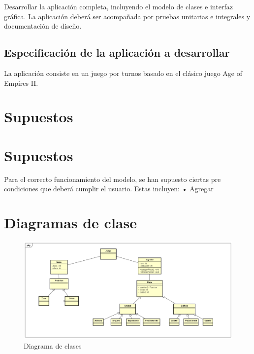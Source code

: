 \documentclass[titlepage,a4paper]{article}
\begin{document}
Desarrollar la aplicación completa, incluyendo el modelo de clases e interfaz gráfica. La aplicación deberá ser acompañada por pruebas unitarias e integrales y documentación de diseño.

\subsection{Especificación de la aplicación a desarrollar}

La aplicación consiste en un juego por turnos basado en el clásico juego Age of Empires II.

\section{Supuestos}\label{sec:supuestos}


\section{Supuestos}\label{sec:supuestos}
Para el correcto funcionamiento del modelo, se han supuesto ciertas pre condiciones que deberá cumplir el usuario.
Estas incluyen:
\bigbreak
•  Agregar
\bigbreak

\bigbreak
\bigbreak 


\section{Diagramas de clase}\label{sec:diagramasdeclase}



\begin{figure}[H]
	\centering
	\includegraphics[width=1.15\textwidth]{juego.png}
	\caption{\label{fig:class01}Diagrama de clases }
\end{figure}
\end{document}
